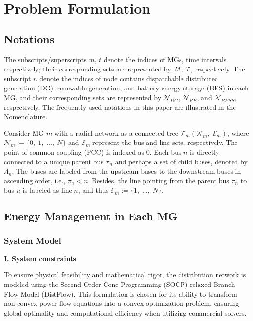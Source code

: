 \documentclass[preprint,12pt]{elsarticle}
\begin{document}
\section{Problem Formulation}
\subsection{Notations}
The subscripts/superscripts $m$, $t$ denote the indices of MGs, time intervals respectively; their corresponding sets are represented by $\mathcal{M}$, $\mathcal{T}$, respectively. The subscript $n$ denote the indices of node contains dispatchable distributed generation (DG), renewable generation, and battery energy storage (BES) in each MG, and their corresponding sets are represented by $\mathcal{N}_{DG}$, $\mathcal{N}_{RE}$, and $\mathcal{N}_{BESS}$, respectively. The frequently used notations in this paper are illustrated in the Nomenclature. 

Consider MG $m$ with a radial network as a connected tree $\mathcal{T}_m(\mathcal{N}_m,\; \mathcal{E}_m)$, where $\mathcal{N}_m := \{0,\; 1,\; \ldots,\; N\}$ and $\mathcal{E}_m$ represent the bus and line sets, respectively. The point of common coupling (PCC) is indexed as 0. Each bus $n$ is directly connected to a unique parent bus $\pi_n$ and perhaps a set of child buses, denoted by $\Lambda_n$. The buses are labeled from the upstream buses to the downstream buses in ascending order, i.e., $\pi_n < n$. Besides, the line pointing from the parent bus $\pi_n$ to bus $n$ is labeled as line $n$, and thus $\mathcal{E}_m := \{1,\; \ldots,\; N\}$.

\subsection{Energy Management in Each MG}

\subsubsection{System Model}
\textbf{I. System constraints}

To ensure physical feasibility and mathematical rigor, the distribution network is modeled using the Second-Order Cone Programming (SOCP) relaxed Branch Flow Model (DistFlow). This formulation is chosen for its ability to transform non-convex power flow equations into a convex optimization problem, ensuring global optimality and computational efficiency when utilizing commercial solvers.
\end{document}
